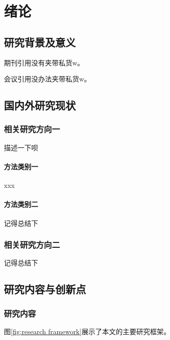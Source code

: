 
\chapter{绪论}
\section{研究背景及意义}
期刊引用\cite{journalkey}没有夹带私货w。

会议引用\cite{conferencekey}没办法夹带私货w。

\section{国内外研究现状}
\subsection{相关研究方向一}

描述一下呗

\subsubsection{方法类别一}
xxx

\subsubsection{方法类别二}

记得总结下

\subsection{相关研究方向二}

记得总结下

\section{研究内容与创新点}
\subsection{研究内容}
图\ref{fig:research framework}展示了本文的主要研究框架。

